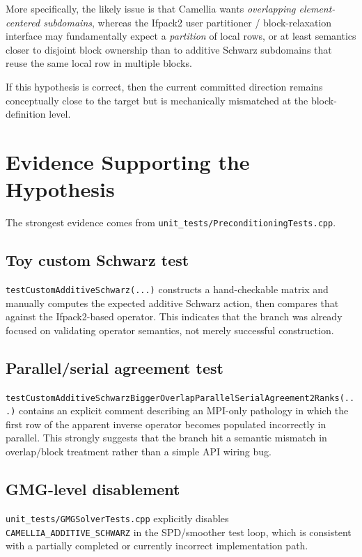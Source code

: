 \documentclass[11pt]{article}
\begin{document}
More specifically, the likely issue is that Camellia wants \emph{overlapping element-centered subdomains}, whereas the Ifpack2 user partitioner / block-relaxation interface may fundamentally expect a \emph{partition} of local rows, or at least semantics closer to disjoint block ownership than to additive Schwarz subdomains that reuse the same local row in multiple blocks.

If this hypothesis is correct, then the current committed direction remains conceptually close to the target but is mechanically mismatched at the block-definition level.

\section{Evidence Supporting the Hypothesis}
The strongest evidence comes from \texttt{unit\_tests/PreconditioningTests.cpp}.

\subsection{Toy custom Schwarz test}
\texttt{testCustomAdditiveSchwarz(...)} constructs a hand-checkable matrix and manually computes the expected additive Schwarz action, then compares that against the Ifpack2-based operator. This indicates that the branch was already focused on validating operator semantics, not merely successful construction.

\subsection{Parallel/serial agreement test}
\texttt{testCustomAdditiveSchwarzBiggerOverlapParallelSerialAgreement2Ranks(...)} contains an explicit comment describing an MPI-only pathology in which the first row of the apparent inverse operator becomes populated incorrectly in parallel. This strongly suggests that the branch hit a semantic mismatch in overlap/block treatment rather than a simple API wiring bug.

\subsection{GMG-level disablement}
\texttt{unit\_tests/GMGSolverTests.cpp} explicitly disables \texttt{CAMELLIA\_ADDITIVE\_SCHWARZ} in the SPD/smoother test loop, which is consistent with a partially completed or currently incorrect implementation path.
\end{document}
